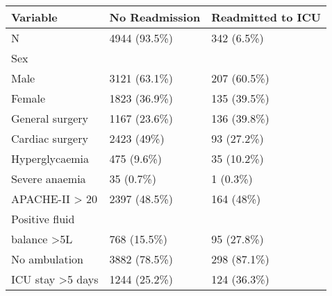 \documentclass[onecolumn]{article}
\begin{document}
\begin{table*}[hb]
\centering
	\renewcommand{\arraystretch}{1.4}
		\caption{}%
	\begin{tabular}{lp{2.5cm}p{2cm}}
		\hline
		Variable & No Readmission & Readmitted to ICU\\
		\hline
		N & 4944 (93.5\%)  &      342 (6.5\%)\\
		Sex &&\\
		\quad Male & 3121 (63.1\%)   &    207 (60.5\%)\\
		\quad Female & 1823 (36.9\%)  &     135 (39.5\%)\\
		General surgery & 1167 (23.6\%)   &    136 (39.8\%)\\
		Cardiac surgery & 2423 (49\%)     &   93 (27.2\%)\\
		Hyperglycaemia & 475 (9.6\%)    &    35 (10.2\%)\\
		Severe anaemia & 35 (0.7\%)      &    1 (0.3\%)\\
		APACHE-II > 20 &  2397 (48.5\%)  &       164 (48\%)\\
		Positive fluid&&\\
		balance >5L & 768 (15.5\%)  &      95 (27.8\%)\\
		No ambulation & 3882 (78.5\%)   &    298 (87.1\%)\\
		ICU stay >5 days & 1244 (25.2\%)   &    124 (36.3\%)\\
		\hline
	\end{tabular}
	\label{Table1Hammer}
\end{table*}
\end{document}
